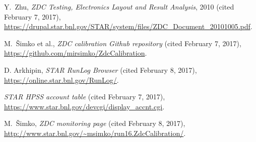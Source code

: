 \begin{thebibliography}{9}
  Y.\ Zhu, \textit{ZDC Testing, Electronics Layout and Result Analysis}, 2010
 (cited February 7, 2017),
 \url{https://drupal.star.bnl.gov/STAR/system/files/ZDC_Document_20101005.pdf}.
 
  M.\ Šimko et al., \textit{ZDC calibration Github repository}
 (cited February 7, 2017), \url{https://github.com/mirsimko/ZdcCalibration}.
  
  D. Arkhipin, \textit{STAR RunLog Browser} (cited February 8, 2017),
 \url{https://online.star.bnl.gov/RunLog/}.
 
  \textit{STAR HPSS account table} (cited February 7, 2017),
 \url{https://www.star.bnl.gov/devcgi/display_accnt.cgi}.
 
  M.\ Šimko, \textit{ZDC monitoring page} (cited February 8, 2017),
 \url{http://www.star.bnl.gov/~msimko/run16.ZdcCalibration/}.
\end{thebibliography}
